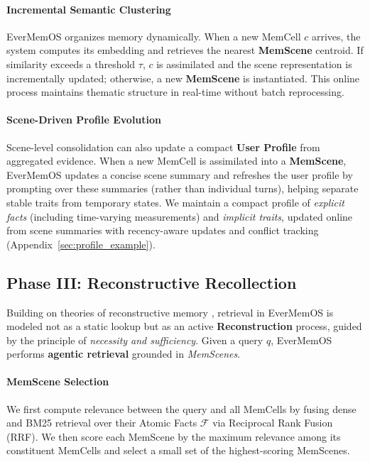 \paragraph{Incremental Semantic Clustering}
EverMemOS organizes memory dynamically. When a new MemCell $c$ arrives, the system computes its embedding and retrieves the nearest \textbf{MemScene} centroid. If similarity exceeds a threshold $\tau$, $c$ is assimilated and the scene representation is incrementally updated; otherwise, a new \textbf{MemScene} is instantiated. This online process maintains thematic structure in real-time without batch reprocessing.

\paragraph{Scene-Driven Profile Evolution}
Scene-level consolidation can also update a compact \textbf{User Profile} from aggregated evidence. When a new MemCell is assimilated into a \textbf{MemScene}, EverMemOS updates a concise scene summary and refreshes the user profile by prompting over these summaries (rather than individual turns), helping separate stable traits from temporary states. We maintain a compact profile of \emph{explicit facts} (including time-varying measurements) and \emph{implicit traits}, updated online from scene summaries with recency-aware updates and conflict tracking (Appendix~\ref{sec:profile_example}).

\subsection{Phase III: Reconstructive Recollection}
Building on theories of reconstructive memory \cite{schacter2008searching}, retrieval in EverMemOS is modeled not as a static lookup but as an active \textbf{Reconstruction} process, guided by the principle of \textit{necessity and sufficiency}. Given a query $q$, EverMemOS performs \textbf{agentic retrieval} grounded in \textit{MemScenes}.

\paragraph{MemScene Selection} We first compute relevance between the query and all MemCells by fusing dense and BM25 retrieval over their Atomic Facts $\mathcal{F}$ via Reciprocal Rank Fusion (RRF). We then score each MemScene by the maximum relevance among its constituent MemCells and select a small set of the highest-scoring MemScenes.

